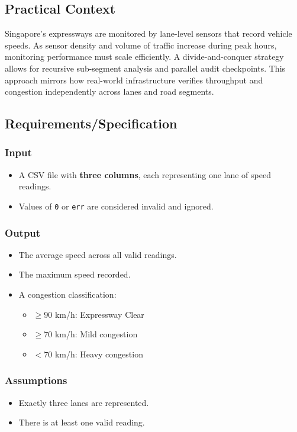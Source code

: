 \documentclass[12pt]{article}
\begin{document}
\subsection{Practical Context}

Singapore’s expressways are monitored by lane-level sensors that record vehicle speeds. As sensor density and volume of traffic increase during peak hours, monitoring performance must scale efficiently. A divide-and-conquer strategy allows for recursive sub-segment analysis and parallel audit checkpoints. This approach mirrors how real-world infrastructure verifies throughput and congestion independently across lanes and road segments.

\subsection{Requirements/Specification}

\subsubsection{Input}
\begin{itemize}
    \item A CSV file with \textbf{three columns}, each representing one lane of speed readings.
    \item Values of \texttt{0} or \texttt{err} are considered invalid and ignored.
\end{itemize}

\subsubsection{Output}
\begin{itemize}
    \item The average speed across all valid readings.
    \item The maximum speed recorded.
    \item A congestion classification:
    \begin{itemize}
        \item $\geq 90$ km/h: Expressway Clear
        \item $\geq 70$ km/h: Mild congestion
        \item $< 70$ km/h: Heavy congestion
    \end{itemize}
\end{itemize}

\subsubsection{Assumptions}
\begin{itemize}
    \item Exactly three lanes are represented.
    \item There is at least one valid reading.
\end{itemize}
\end{document}
